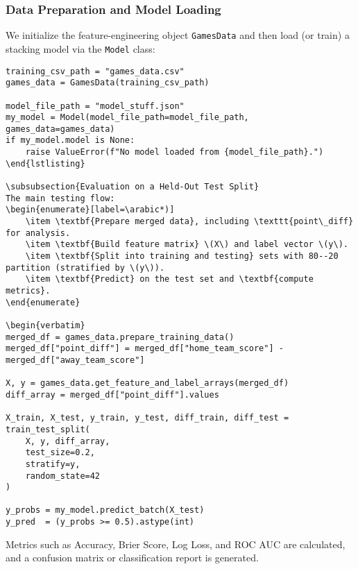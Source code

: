 \documentclass[12pt]{article}
\begin{document}
\subsubsection{Data Preparation and Model Loading}
We initialize the feature-engineering object \texttt{GamesData} and then load (or train) a stacking model via the \texttt{Model} class:
\begin{verbatim}
training_csv_path = "games_data.csv"
games_data = GamesData(training_csv_path)

model_file_path = "model_stuff.json"
my_model = Model(model_file_path=model_file_path, games_data=games_data)
if my_model.model is None:
    raise ValueError(f"No model loaded from {model_file_path}.")
\end{lstlisting}

\subsubsection{Evaluation on a Held-Out Test Split}
The main testing flow:
\begin{enumerate}[label=\arabic*)]
    \item \textbf{Prepare merged data}, including \texttt{point\_diff} for analysis.
    \item \textbf{Build feature matrix} \(X\) and label vector \(y\).
    \item \textbf{Split into training and testing} sets with 80--20 partition (stratified by \(y\)).
    \item \textbf{Predict} on the test set and \textbf{compute metrics}.
\end{enumerate}

\begin{verbatim}
merged_df = games_data.prepare_training_data()
merged_df["point_diff"] = merged_df["home_team_score"] - merged_df["away_team_score"]

X, y = games_data.get_feature_and_label_arrays(merged_df)
diff_array = merged_df["point_diff"].values

X_train, X_test, y_train, y_test, diff_train, diff_test = train_test_split(
    X, y, diff_array,
    test_size=0.2,
    stratify=y,
    random_state=42
)

y_probs = my_model.predict_batch(X_test)
y_pred  = (y_probs >= 0.5).astype(int)
\end{verbatim}

\noindent
Metrics such as Accuracy, Brier Score, Log Loss, and ROC AUC are calculated, and a confusion matrix or classification report is generated.
\end{document}
